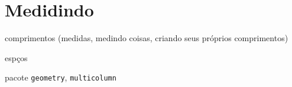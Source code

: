 \section{Medidindo}

comprimentos  (medidas, medindo coisas, criando seus próprios
comprimentos)

espços

pacote \verb!geometry!, \verb!multicolumn!
